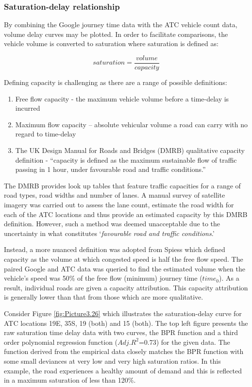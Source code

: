 \documentclass{CUP-JNL-DCE}
\begin{document}
\subsubsection{Saturation-delay relationship} \label{sat-delay}

By combining the Google journey time data with the ATC vehicle count data, volume delay curves may be plotted. In order to facilitate comparisons, the vehicle volume is converted to saturation where saturation is defined as:

\begin{equation}
	saturation = \frac{volume}{capacity}
\end{equation}

Defining capacity is challenging as there are a range of possible definitions:

\begin{enumerate}
	\item Free flow capacity - the maximum vehicle volume before a time-delay is incurred
	\item Maximum flow capacity – absolute vehicular volume a road can carry with no regard to time-delay
	\item The UK Design Manual for Roads and Bridges (DMRB) qualitative capacity definition - “capacity is defined as the maximum sustainable flow of traffic passing in 1 hour, under favourable road and traffic conditions.” \citep{DMRB}
\end{enumerate}

The DMRB provides look up tables that feature traffic capacities for a range of road types, road widths and number of lanes. A manual survey of satellite imagery was carried out to assess the lane count, estimate the road width for each of the ATC locations and thus provide an estimated capacity by this DMRB definition. However, such a method was deemed unacceptable due to the uncertainty in what constitutes ‘\textit{favourable road and traffic conditions}.’

Instead, a more nuanced definition was adopted from Spiess \citep{spiess1990technical} which defined capacity as the volume at which congested speed is half the free flow speed. The paired Google and ATC data was queried to find the estimated volume when the vehicle's speed was 50\% of the free flow (minimum) journey time ($time_{0}$). As a result, individual roads are given a capacity attribution. This capacity attribution is generally lower than that from those which are more qualitative. 

Consider Figure \ref{fig:Picture3.26} which illustrates the saturation-delay curve for ATC locations 19E, 35S, 19 (both) and 15 (both). The top left figure presents the raw saturation time delay data with two curves, the BPR function and a third order polynomial regression function ($Adj. R^2$=0.73) for the given data. The function derived from the empirical data closely matches the BPR function with some small deviances at very low and very high saturation ratios. In this example, the road experiences a healthy amount of demand and this is reflected in a maximum saturation of less than 120\%. 
\end{document}

